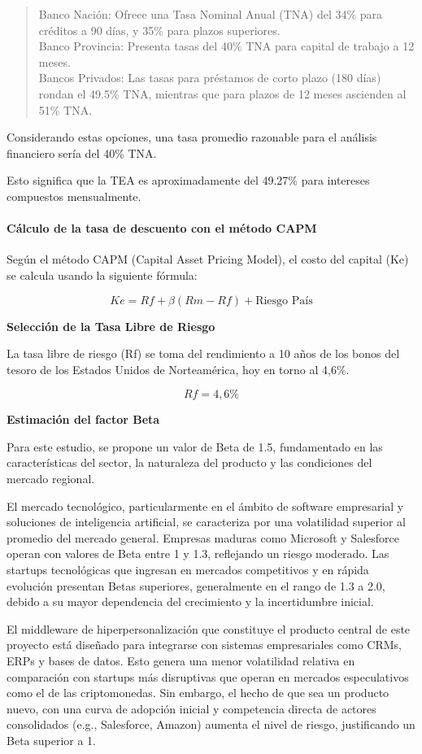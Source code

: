 \begin{quote}
Banco Nación: Ofrece una Tasa Nominal Anual (TNA) del 34\% para créditos a 90 días, y 35\% para plazos superiores.\\
Banco Provincia: Presenta tasas del 40\% TNA para capital de trabajo a 12 meses.\\
Bancos Privados: Las tasas para préstamos de corto plazo (180 días) rondan el 49.5\% TNA, mientras que para plazos de 12 meses ascienden al 51\% TNA.
\end{quote}

Considerando estas opciones, una tasa promedio razonable para el análisis financiero sería del 40\% TNA. 

Esto significa que la TEA es aproximadamente del 49.27\% para intereses compuestos mensualmente.

\paragraph{Cálculo de la tasa de descuento con el método CAPM}

Según el método CAPM (Capital Asset Pricing Model), el costo del capital (Ke) se calcula usando la siguiente fórmula:

\[Ke = Rf + \beta (Rm - Rf) + \text{Riesgo País}\]

\textbf{Selección de la Tasa Libre de Riesgo}

La tasa libre de riesgo (Rf) se toma del rendimiento a 10 años de los bonos del tesoro de los Estados Unidos de Norteamérica, hoy en torno al 4,6\%.

\[Rf = 4,6\%\]

\textbf{Estimación del factor Beta}

Para este estudio, se propone un valor de Beta de 1.5, fundamentado en las características del sector, la naturaleza del producto y las condiciones del mercado regional.

El mercado tecnológico, particularmente en el ámbito de software empresarial y soluciones de inteligencia artificial, se caracteriza por una volatilidad superior al promedio del mercado general. Empresas maduras como Microsoft y Salesforce operan con valores de Beta entre 1 y 1.3, reflejando un riesgo moderado. Las startups tecnológicas que ingresan en mercados competitivos y en rápida evolución presentan Betas superiores, generalmente en el rango de 1.3 a 2.0, debido a su mayor dependencia del crecimiento y la incertidumbre inicial.

El middleware de hiperpersonalización que constituye el producto central de este proyecto está diseñado para integrarse con sistemas empresariales como CRMs, ERPs y bases de datos. Esto genera una menor volatilidad relativa en comparación con startups más disruptivas que operan en mercados especulativos como el de las criptomonedas. Sin embargo, el hecho de que sea un producto nuevo, con una curva de adopción inicial y competencia directa de actores consolidados (e.g., Salesforce, Amazon) aumenta el nivel de riesgo, justificando un Beta superior a 1.

